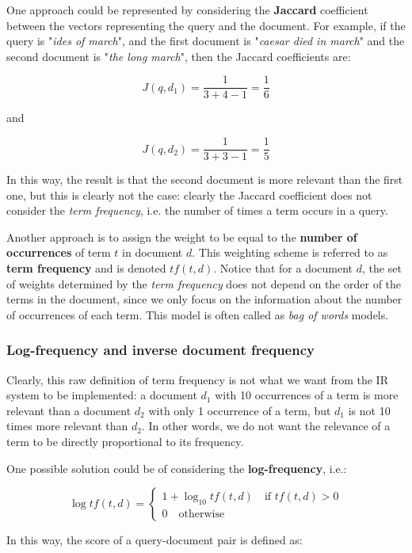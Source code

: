 One approach could be represented by considering the \textbf{Jaccard} coefficient between the vectors representing the query and the document. For example, if the query is "\textit{ides of march}", and the first document is "\textit{caesar died in march}" and the second document is "\textit{the long march}", then the Jaccard coefficients are:

$$
J(q,d_1) = \frac{1}{3+4-1} = \frac{1}{6}
$$

and 

$$
J(q,d_2) = \frac{1}{3+3-1} = \frac{1}{5}
$$

In this way, the result is that the second document is more relevant than the first one, but this is clearly not the case: clearly the Jaccard coefficient does not consider the \textit{term frequency}, i.e. the number of times a term occurs in a query.

Another approach is to assign the weight to be equal to the \textbf{number of occurrences} of term $t$ in document $d$. This weighting scheme is referred to as \textbf{term frequency} and is denoted $tf(t,d)$. Notice that for a document $d$, the set of weights determined by the \textit{term frequency} does not depend on the order of the terms in the document, since we only focus on the information about the number of occurrences of each term. This model is often called as \textit{bag of words} models. 

\subsubsection{Log-frequency and inverse document frequency}
Clearly, this raw definition of term frequency is not what we want from the IR system to be implemented: a document $d_1$ with 10 occurrences of a term is more relevant than a document $d_2$ with only 1 occurrence of a term, but $d_1$ is not 10 times more relevant than $d_2$. In other words, we do not want the relevance of a term to be directly proportional to its frequency.

One possible solution could be of considering the \textbf{log-frequency}, i.e.:

$$
\log tf(t,d) = \begin{cases}
1 + \log_{10} tf(t,d) \quad \text{if }tf(t,d)>0\\
0 \quad \text{otherwise }
\end{cases}
$$

In this way, the score of a query-document pair is defined as:

